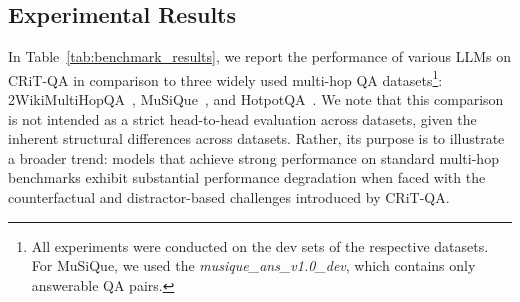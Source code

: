 \documentclass[10pt, a4paper]{article}
\begin{document}
\begin{table}[t!]
\centering
{}
\caption{Performance comparison on CRiT-QA according to hop length.}
\label{tab:benchmark_results_hop}
\end{table}



\subsection{Experimental Results}
In Table~\ref{tab:benchmark_results}, we report the performance of various LLMs on CRiT-QA in comparison to three widely used multi-hop QA datasets\footnote{All experiments were conducted on the dev sets of the respective datasets. For MuSiQue, we used the \textit{musique\_ans\_v1.0\_dev}, which contains only answerable QA pairs.}: 2WikiMultiHopQA~\cite{ho-etal-2020-constructing}, MuSiQue~\cite{trivedi-etal-2022-musique}, and HotpotQA~\cite{yang-etal-2018-hotpotqa}. We note that this comparison is not intended as a strict head-to-head evaluation across datasets, given the inherent structural differences across datasets. Rather, its purpose is to illustrate a broader trend: models that achieve strong performance on standard multi-hop benchmarks exhibit substantial performance degradation when faced with the counterfactual and distractor-based challenges introduced by CRiT-QA.
\end{document}

